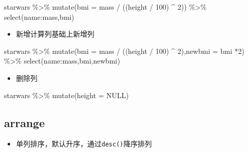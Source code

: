 \documentclass[
]{book}
\newenvironment{Shaded}{\begin{snugshade}}{\end{snugshade}}
\newcommand{\AttributeTok}[1]{\textcolor[rgb]{0.77,0.63,0.00}{#1}}
\newcommand{\ConstantTok}[1]{\textcolor[rgb]{0.00,0.00,0.00}{#1}}
\newcommand{\DecValTok}[1]{\textcolor[rgb]{0.00,0.00,0.81}{#1}}
\newcommand{\FunctionTok}[1]{\textcolor[rgb]{0.00,0.00,0.00}{#1}}
\newcommand{\NormalTok}[1]{#1}
\newcommand{\SpecialCharTok}[1]{\textcolor[rgb]{0.00,0.00,0.00}{#1}}
\providecommand{\tightlist}{%
  \setlength{\itemsep}{0pt}\setlength{\parskip}{0pt}}
\begin{document}
\begin{Shaded}
\begin{Highlighting}[]
\NormalTok{starwars }\SpecialCharTok{\%\textgreater{}\%} 
  \FunctionTok{mutate}\NormalTok{(}\AttributeTok{bmi =}\NormalTok{ mass }\SpecialCharTok{/}\NormalTok{ ((height }\SpecialCharTok{/} \DecValTok{100}\NormalTok{)  }\SpecialCharTok{\^{}} \DecValTok{2}\NormalTok{)) }\SpecialCharTok{\%\textgreater{}\%} 
  \FunctionTok{select}\NormalTok{(name}\SpecialCharTok{:}\NormalTok{mass,bmi)}
\end{Highlighting}
\end{Shaded}

\begin{itemize}
\tightlist
\item
  新增计算列基础上新增列
\end{itemize}

\begin{Shaded}
\begin{Highlighting}[]
\NormalTok{starwars }\SpecialCharTok{\%\textgreater{}\%} 
  \FunctionTok{mutate}\NormalTok{(}\AttributeTok{bmi =}\NormalTok{ mass }\SpecialCharTok{/}\NormalTok{ ((height }\SpecialCharTok{/} \DecValTok{100}\NormalTok{)  }\SpecialCharTok{\^{}} \DecValTok{2}\NormalTok{),}\AttributeTok{newbmi =}\NormalTok{ bmi }\SpecialCharTok{*}\DecValTok{2}\NormalTok{) }\SpecialCharTok{\%\textgreater{}\%} 
  \FunctionTok{select}\NormalTok{(name}\SpecialCharTok{:}\NormalTok{mass,bmi,newbmi)}
\end{Highlighting}
\end{Shaded}

\begin{itemize}
\tightlist
\item
  删除列
\end{itemize}

\begin{Shaded}
\begin{Highlighting}[]
\NormalTok{starwars }\SpecialCharTok{\%\textgreater{}\%} \FunctionTok{mutate}\NormalTok{(}\AttributeTok{height =} \ConstantTok{NULL}\NormalTok{)}
\end{Highlighting}
\end{Shaded}

\hypertarget{dplyr-arrange}{%
\subsection{arrange}\label{dplyr-arrange}}

\begin{itemize}
\tightlist
\item
  单列排序，默认升序，通过\texttt{desc()}降序排列
\end{itemize}
\end{document}
